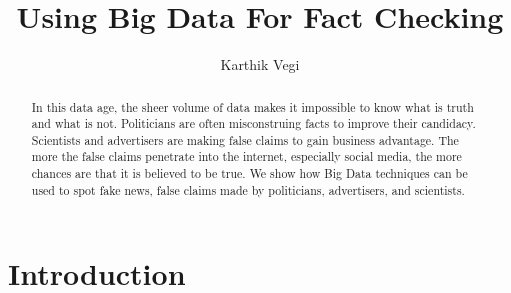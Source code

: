 \documentclass[sigconf]{acmart}
\begin{document}
\title{Using Big Data For Fact Checking}

\author{Karthik Vegi}


\renewcommand{\shortauthors}{kvegi}


\begin{abstract}
In this data age, the sheer volume of data makes it impossible to know what is truth and what is not. Politicians are often misconstruing facts to improve their candidacy. Scientists and advertisers are making false claims to gain business advantage.  The more the false claims penetrate into the internet, especially social media, the more chances are that it is believed to be true. We show how Big Data techniques can be used to spot fake news, false claims made by politicians, advertisers, and scientists.
\end{abstract}


\maketitle

\section{Introduction}
\end{document}
